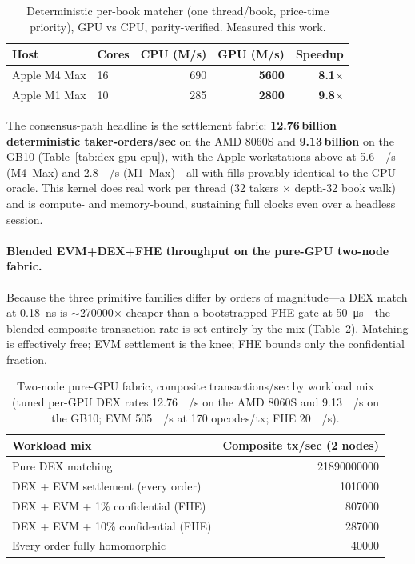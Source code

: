 \begin{table}[h]
\centering
\caption{Deterministic per-book matcher (one thread/book, price-time priority), GPU vs CPU,
parity-verified. Measured this work.}
\label{tab:acct-detmatch}
\begin{tabular}{llrrr}
\toprule
\textbf{Host} & \textbf{Cores} & \textbf{CPU (M/s)} & \textbf{GPU (M/s)} & \textbf{Speedup} \\
\midrule
Apple M4 Max & 16 & 690 & \textbf{5600} & \textbf{8.1$\times$} \\
Apple M1 Max & 10 & 285 & \textbf{2800} & \textbf{9.8$\times$} \\
\bottomrule
\end{tabular}
\end{table}

\noindent The consensus-path headline is the settlement fabric: \textbf{12.76\,billion
deterministic taker-orders/sec} on the AMD 8060S and \textbf{9.13\,billion} on the GB10
(Table~\ref{tab:dex-gpu-cpu}), with the Apple workstations above at \SI{5.6}{\giga{}/
\second} (M4~Max) and \SI{2.8}{\giga{}/\second} (M1~Max)---all with fills provably
identical to the CPU oracle. This kernel does real work per thread (\num{32} takers $\times$
depth-\num{32} book walk) and is compute- and memory-bound, sustaining full clocks even over a
headless session.

\paragraph{Blended EVM+DEX+FHE throughput on the pure-GPU two-node fabric.}
Because the three primitive families differ by orders of magnitude---a DEX match at
\SI{0.18}{\nano\second} is $\sim$\num{270000}$\times$ cheaper than a bootstrapped FHE gate at
\SI{50}{\micro\second}---the blended composite-transaction rate is set entirely by the mix
(Table~\ref{tab:acct-blend}). Matching is effectively free; EVM settlement is the knee; FHE bounds
only the confidential fraction.

\begin{table}[h]
\centering
\caption{Two-node pure-GPU fabric, composite transactions/sec by workload mix (tuned per-GPU DEX
rates \SI{12.76}{\giga{}/\second} on the AMD 8060S and \SI{9.13}{\giga{}/\second}
on the GB10; EVM \SI{505}{\kilo{}/\second} at 170 opcodes/tx; FHE
\SI{20}{\kilo{}/\second}).}
\label{tab:acct-blend}
\begin{tabular}{lr}
\toprule
\textbf{Workload mix} & \textbf{Composite tx/sec (2 nodes)} \\
\midrule
Pure DEX matching                       & \num{21890000000} \\
DEX + EVM settlement (every order)      & \num{1010000} \\
DEX + EVM + 1\% confidential (FHE)      & \num{807000} \\
DEX + EVM + 10\% confidential (FHE)     & \num{287000} \\
Every order fully homomorphic           & \num{40000} \\
\bottomrule
\end{tabular}
\end{table}

